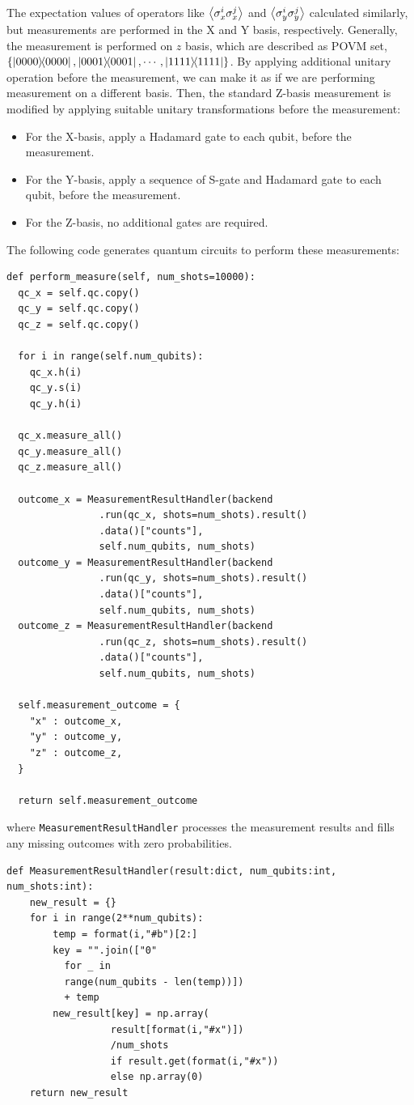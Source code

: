 \documentclass[a4paper, 11pt]{article}
\begin{document}
The expectation values of operators like $\expectationvalue{\sigma_{x}^{i}\sigma_{x}^{j}}$ and $\expectationvalue{\sigma_{y}^{i}\sigma_{y}^{j}}$  calculated similarly, but measurements are performed in the X and Y basis, respectively.
Generally, the measurement is performed on $z$ basis, which are described as POVM set, $\left\{ \ketbra{0000}, \ketbra{0001} , \cdots, \ketbra{1111} \right\}$.
By applying additional unitary operation before the measurement, we can make it as if we are performing measurement on a different basis.
Then, the standard Z-basis measurement is modified by applying suitable unitary transformations before the measurement:
\begin{itemize}
  \item For the X-basis, apply a Hadamard gate to each qubit, before the measurement.
  \item For the Y-basis, apply a sequence of S-gate and Hadamard gate to each qubit, before the measurement.
  \item For the Z-basis, no additional gates are required.
\end{itemize}
The following code generates quantum circuits to perform these measurements: 
\begin{verbatim}
def perform_measure(self, num_shots=10000):
  qc_x = self.qc.copy()
  qc_y = self.qc.copy()
  qc_z = self.qc.copy()

  for i in range(self.num_qubits):
    qc_x.h(i)
    qc_y.s(i)
    qc_y.h(i)

  qc_x.measure_all()
  qc_y.measure_all()
  qc_z.measure_all()

  outcome_x = MeasurementResultHandler(backend
                .run(qc_x, shots=num_shots).result()
                .data()["counts"], 
                self.num_qubits, num_shots)
  outcome_y = MeasurementResultHandler(backend
                .run(qc_y, shots=num_shots).result()
                .data()["counts"], 
                self.num_qubits, num_shots)
  outcome_z = MeasurementResultHandler(backend
                .run(qc_z, shots=num_shots).result()
                .data()["counts"], 
                self.num_qubits, num_shots)

  self.measurement_outcome = {
    "x" : outcome_x,
    "y" : outcome_y,
    "z" : outcome_z,
  }

  return self.measurement_outcome
\end{verbatim}
where \texttt{MeasurementResultHandler} processes the measurement results and fills any missing outcomes with zero probabilities.
\begin{verbatim}
def MeasurementResultHandler(result:dict, num_qubits:int, num_shots:int):
	new_result = {}
	for i in range(2**num_qubits):
		temp = format(i,"#b")[2:]
		key = "".join(["0" 
          for _ in 
          range(num_qubits - len(temp))]) 
          + temp
		new_result[key] = np.array(
                  result[format(i,"#x")])
                  /num_shots 
                  if result.get(format(i,"#x")) 
                  else np.array(0)
	return new_result
\end{verbatim}
\end{document}
